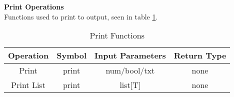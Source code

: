 \textbf{Print Operations}\\
Functions used to print to output, seen in table \ref{tbl:print}.
\begin{table}[h]
	\centering
	\caption{Print Functions}
	\label{tbl:print}
	\begin{tabular}{|c|c|c|c|}
		\hline
		\textbf{Operation}  & \textbf{Symbol}    & \textbf{Input Parameters} & \textbf{Return Type} \\ \hline
		Print      & print     & num/bool/txt     & none        \\ \hline
		Print List & print     & list[T]          & none        \\ \hline
	\end{tabular}
\end{table}
\newpage
